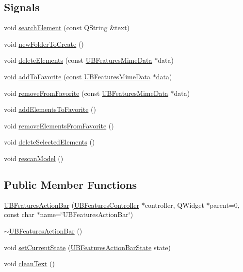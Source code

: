 \subsection*{Signals}
\begin{DoxyCompactItemize}
\item 
void \hyperlink{class_u_b_features_action_bar_a39a52a8fce9c541d3b5cf5a41498ef01}{search\-Element} (const Q\-String \&text)
\item 
void \hyperlink{class_u_b_features_action_bar_a30066887b3866485d8dbf208361ee820}{new\-Folder\-To\-Create} ()
\item 
void \hyperlink{class_u_b_features_action_bar_ad589ee01c81657578c7da6f21da1b36d}{delete\-Elements} (const \hyperlink{class_u_b_features_mime_data}{U\-B\-Features\-Mime\-Data} $\ast$data)
\item 
void \hyperlink{class_u_b_features_action_bar_aba67d98128e8bd630b9e71179cf0d0d3}{add\-To\-Favorite} (const \hyperlink{class_u_b_features_mime_data}{U\-B\-Features\-Mime\-Data} $\ast$data)
\item 
void \hyperlink{class_u_b_features_action_bar_ae14bdabf1997d703ba06c5b3c96e9bb7}{remove\-From\-Favorite} (const \hyperlink{class_u_b_features_mime_data}{U\-B\-Features\-Mime\-Data} $\ast$data)
\item 
void \hyperlink{class_u_b_features_action_bar_a4efc551e002a4c18a86e0e08a3a6cf68}{add\-Elements\-To\-Favorite} ()
\item 
void \hyperlink{class_u_b_features_action_bar_ad98a309cdc263a8903a66350d4eadc0a}{remove\-Elements\-From\-Favorite} ()
\item 
void \hyperlink{class_u_b_features_action_bar_a4b196bdb6db18808e3fad1032de46377}{delete\-Selected\-Elements} ()
\item 
void \hyperlink{class_u_b_features_action_bar_ac8ae0628b5a9be66a377d45f04aeac26}{rescan\-Model} ()
\end{DoxyCompactItemize}
\subsection*{Public Member Functions}
\begin{DoxyCompactItemize}
\item 
\hyperlink{class_u_b_features_action_bar_a631a181efda4a630f40d9502515c79bc}{U\-B\-Features\-Action\-Bar} (\hyperlink{class_u_b_features_controller}{U\-B\-Features\-Controller} $\ast$controller, Q\-Widget $\ast$parent=0, const char $\ast$name=\char`\"{}U\-B\-Features\-Action\-Bar\char`\"{})
\item 
\hyperlink{class_u_b_features_action_bar_a7d1c33d30b84f81097cb23358c9280bd}{$\sim$\-U\-B\-Features\-Action\-Bar} ()
\item 
void \hyperlink{class_u_b_features_action_bar_a619d52cadd37cef8562972ac359663cd}{set\-Current\-State} (\hyperlink{_u_b_features_action_bar_8h_abc6049497f39775f92ce93e6ad0a2d8e}{U\-B\-Features\-Action\-Bar\-State} state)
\item 
void \hyperlink{class_u_b_features_action_bar_a7100128f156f31c1e3022f877ce0627d}{clean\-Text} ()
\end{DoxyCompactItemize}
